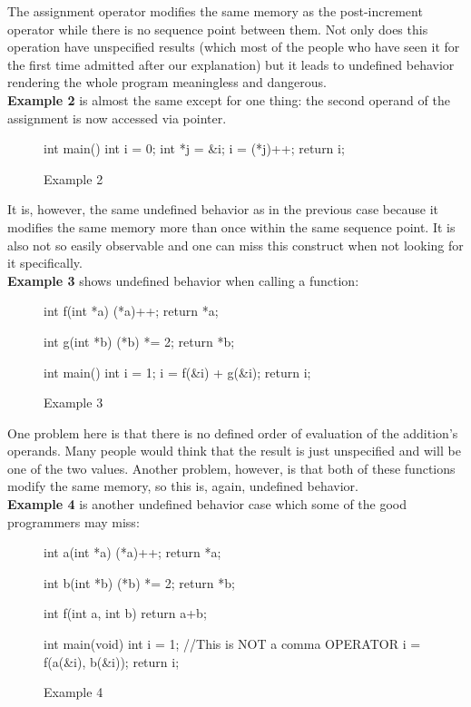 The assignment operator modifies the same memory as the post-increment operator while there is no sequence point between them. Not only does this operation have unspecified results (which most of the people who have seen it for the first time admitted after our explanation) but it leads to undefined behavior rendering the whole program meaningless and dangerous.
\\

\textbf{Example 2} is almost the same except for one thing: the second operand of the assignment is now accessed via pointer.

\begin{figure}[h!]
\caption{Example 2}
\begin{code}
int main(){
	int i = 0;
	int *j = &i;
	i = (*j)++;
    return i;
}
\end{code}
\end{figure}

It is, however, the same undefined behavior as in the previous case because it modifies the same memory more than once within the same sequence point. It is also not so easily observable and one can miss this construct when not looking for it specifically.
\\

\textbf{Example 3} shows undefined  behavior when calling a function:

\begin{figure}[h!]
\caption{Example 3}
\begin{code}
int f(int *a){
    (*a)++;
    return *a;
}

int g(int *b){
    (*b) *= 2;
    return *b;
}

int main(){
    int i = 1;
    i = f(&i) + g(&i);
    return i;
}
\end{code}
\end{figure}

One problem here is that there is no defined order of evaluation of the addition's operands. Many people would think that the result is just unspecified and will be one of the two values. Another problem, however, is that both of these functions modify the same memory, so this is, again, undefined behavior.
\\

\textbf{Example 4} is another undefined behavior case which some of the good programmers may miss:

\begin{figure}[h!]
\caption{Example 4}
\begin{code}
int a(int *a){
    (*a)++;
    return *a;
}

int b(int *b){
    (*b) *= 2;
    return *b;
}

int f(int a, int b){
    return a+b;
}

int main(void){
    int i = 1;
    //This is NOT a comma OPERATOR
    i = f(a(&i), b(&i));
    return i;
}
\end{code}
\end{figure}

